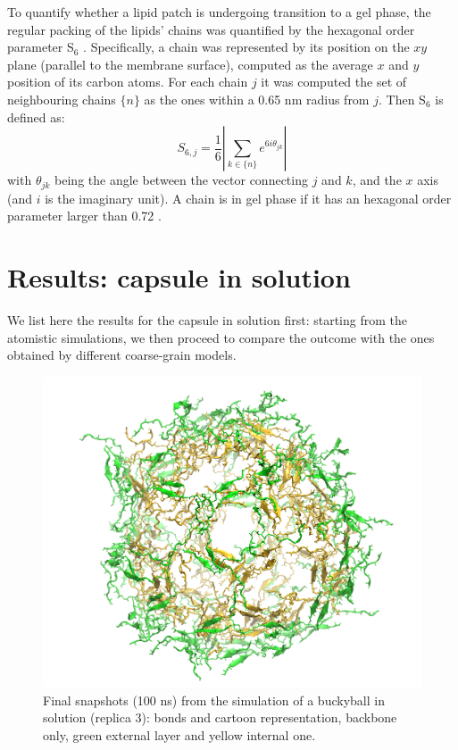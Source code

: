 To quantify whether a lipid patch is undergoing transition to a gel phase, the regular packing of the lipids' chains was quantified by the hexagonal order parameter S$_6$ \cite{Uppulury2015}. Specifically, a chain was represented by its position on the $xy$ plane (parallel to the membrane surface), computed as the average $x$ and $y$ position of its carbon atoms.
%
For each chain $j$ it was computed the set of neighbouring chains $\{n\}$ as the ones within a 0.65 nm radius from $j$. Then S$_6$ is defined as:
\begin{equation}
S_{6,j} = \frac{1}{6} \left| \sum_{k \in \{n\}} e^{6i\theta_{jk}} \right|
\end{equation}
with $\theta_{jk}$ being the angle between the vector connecting $j$ and $k$, and the $x$ axis (and $i$ is the imaginary unit). A chain is in gel phase if it has an hexagonal order parameter larger than 0.72 \cite{Uppulury2015}.


\section{Results: capsule in solution} \label{sec:results_cap}
We list here the results for the capsule in solution first: starting from the atomistic simulations, we then proceed to compare the outcome with the ones obtained by different coarse-grain models.

\begin{figure}[t]
\centering
\includegraphics[width=0.5\linewidth]{3results_capsule/pics/staR3_render}
\caption[Atomistic run of buckyball in solution: final configuration]{Final snapshots (100 ns) from the simulation of a buckyball in solution (replica 3): bonds and cartoon representation, backbone only, green external layer and yellow internal one.}
\label{fig:BTI_snap}
\end{figure}

